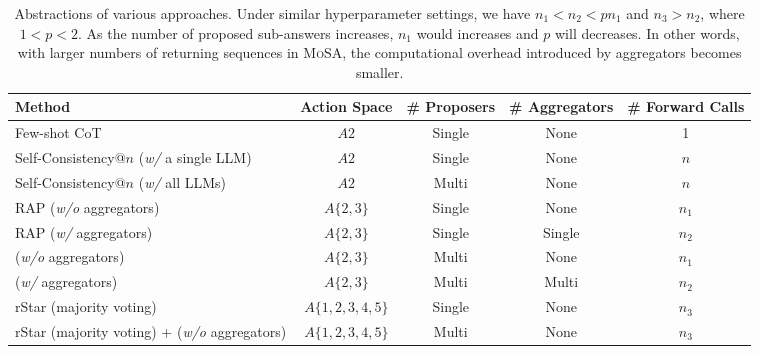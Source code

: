 \begin{table*}[t]
\caption{
Abstractions of various approaches. Under similar hyperparameter settings, we have $n_1 < n_2 < p n_1$ and $n_3 > n_2$, where $1 < p < 2$. As the number of proposed sub-answers increases, $n_1$ would increases and $p$ will decreases. In other words, with larger numbers of returning sequences in \textsc{MoSA}, the computational overhead introduced by aggregators becomes smaller.
}
\label{tab:abstraction}
\vskip 0.15in
\begin{center}
\begin{small}
\begin{tabular}{lcccc}
\toprule
Method & Action Space & \# Proposers & \# Aggregators & \# Forward Calls \\
\midrule
Few-shot CoT & $A2$ & Single & None & 1 \\
Self-Consistency@$n$ (\emph{w/} a single LLM) & $A2$ & Single & None & $n$ \\
Self-Consistency@$n$ (\emph{w/} all LLMs) & $A2$ & Multi & None & $n$ \\
RAP (\emph{w/o} aggregators) & $A\{2,3\}$ & Single & None & $n_1$ \\
RAP (\emph{w/} aggregators) & $A\{2,3\}$ & Single & Single & $n_2$ \\
\ourmethod{} (\emph{w/o} aggregators) & $A\{2,3\}$ & Multi & None & $n_1$ \\
\ourmethod{} (\emph{w/} aggregators) & $A\{2,3\}$ & Multi & Multi & $n_2$ \\
rStar (majority voting) & $A\{1,2,3,4,5\}$ & Single & None & $n_3$ \\
rStar (majority voting) + \ourmethod{} (\emph{w/o} aggregators) & $A\{1,2,3,4,5\}$ & Multi & None & $n_3$ \\
\bottomrule
\end{tabular}
\end{small}
\end{center}
\vskip -0.1in
\end{table*}
